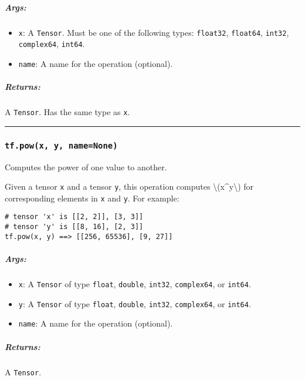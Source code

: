 \subparagraph{Args: }\label{args-13}

\begin{itemize}
\tightlist
\item
  \texttt{x}: A \texttt{Tensor}. Must be one of the following types:
  \texttt{float32}, \texttt{float64}, \texttt{int32},
  \texttt{complex64}, \texttt{int64}.
\item
  \texttt{name}: A name for the operation (optional).
\end{itemize}

\subparagraph{Returns: }\label{returns-13}

A \texttt{Tensor}. Has the same type as \texttt{x}.

\begin{center}\rule{0.5\linewidth}{\linethickness}\end{center}

\subsubsection{\texorpdfstring{\texttt{tf.pow(x,\ y,\ name=None)}
}{tf.pow(x, y, name=None) }}\label{tf.powx-y-namenone}

Computes the power of one value to another.

Given a tensor \texttt{x} and a tensor \texttt{y}, this operation
computes \textbackslash{}(x\^{}y\textbackslash{}) for corresponding
elements in \texttt{x} and \texttt{y}. For example:

\begin{verbatim}
# tensor 'x' is [[2, 2]], [3, 3]]
# tensor 'y' is [[8, 16], [2, 3]]
tf.pow(x, y) ==> [[256, 65536], [9, 27]]
\end{verbatim}

\subparagraph{Args: }\label{args-14}

\begin{itemize}
\tightlist
\item
  \texttt{x}: A \texttt{Tensor} of type \texttt{float}, \texttt{double},
  \texttt{int32}, \texttt{complex64}, or \texttt{int64}.
\item
  \texttt{y}: A \texttt{Tensor} of type \texttt{float}, \texttt{double},
  \texttt{int32}, \texttt{complex64}, or \texttt{int64}.
\item
  \texttt{name}: A name for the operation (optional).
\end{itemize}

\subparagraph{Returns: }\label{returns-14}

A \texttt{Tensor}.

